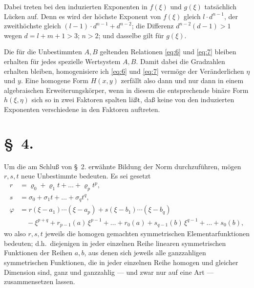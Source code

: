 \documentclass[fontsize=10pt,paper=a5,pagesize,headings=small]{scrbook}
\theoremstyle{plain}
\begin{document}
Dabei treten bei den induzierten Exponenten in $f(\xi)$ und $g(\xi)$ tatsächlich
Lücken auf. Denn es wird der höchste Exponent von $f(\xi)$ gleich $l \cdot d^{n-1}$,
der zweithöchste gleich $(l-1) \cdot d^{n-1} + d^{n-2}$; die Differenz $d^{n-2}(d-1) > 1$
wegen $d = l+m+1 > 3$; $n > 2$; und dasselbe gilt für $g(\xi)$.

Die für die Unbestimmten $A,B$ geltenden Relationen \eqref{eq:6} und \eqref{eq:7}
bleiben erhalten für jedes spezielle Wertsystem $A,B$. Damit dabei die Gradzahlen
erhalten bleiben, homogenisiere ich \eqref{eq:6} und \eqref{eq:7} vermöge der Veränderlichen
$\eta$ und $y$. Eine homogene Form $H(x,y)$ zerfällt also dann und nur dann in einem
algebraischen Erweiterungskörper, wenn in diesem die entsprechende binäre Form
$h(\xi,\eta)$ sich so in zwei Faktoren spalten läßt, daß keine von den induzierten
Exponenten verschiedene in den Faktoren auftreten.

\section*{\S~4.}
\setcounter{section}{4}

Um die am Schluß von \S~2. erwähnte Bildung der Norm durchzuführen,
mögen $r, s, t$ neue Unbestimmte bedeuten. Es sei gesetzt
\begin{equation}
\label{eq:8}
\begin{aligned}
r &= \varrho_0 + \varrho_1 t + \dots + \varrho_p t^p,\\
s &= \sigma_0 + \sigma_1 t + \dots + \sigma_q t^q,\\
\varphi &= r(\xi - a_1)\cdots(\xi - a_p) + s(\xi - b_1)\cdots(\xi - b_q)\\
&\quad - \xi^{p+q} + r_{p-1}(a)\,\xi^{p-1} + \dots + r_0(a) + s_{q-1}(b)\,\xi^{q-1} + \dots + s_0(b),
\end{aligned}
\end{equation}
wo also $r,s,t$ jeweils die homogen gemachten symmetrischen Elementarfunktionen
bedeuten; d.h.~diejenigen in jeder einzelnen Reihe linearen symmetrischen Funktionen
der Reihen $a,b$, aus denen sich jeweils alle ganzzahligen symmetrischen Funktionen,
die in jeder einzelnen Reihe homogen und gleicher Dimension sind, ganz und
ganzzahlig --- und zwar nur auf eine Art --- zusammensetzen lassen.
\end{document}
